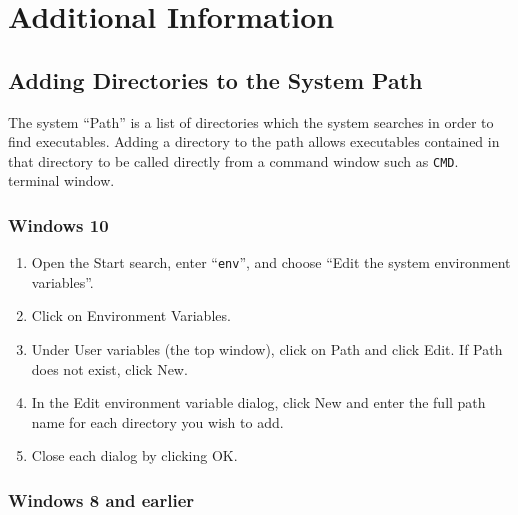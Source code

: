 \section{Additional Information}

\subsection{Adding Directories to the System Path}
\label{SettingPath}

The system ``Path'' is a list of directories which the system searches
in order to find executables. Adding a directory to the path allows
executables contained in that directory to be called directly from a
\ifWindows
command window such as {\tt CMD}.
\else
terminal window.
\fi

\ifWindows

\subsubsection{Windows 10}

\begin{enumerate}

\item Open the {\sf Start} search, enter ``{\tt env}'', and choose
{\sf ``Edit the system environment variables''}.

\item Click on {\sf Environment Variables}.

\item Under {\sf User variables} (the top window), click on {\sf Path}
and click {\sf Edit}. If {\sf Path} does not exist, click {\sf New}.

\item In the {\sf Edit environment variable} dialog, click {\sf New}
and enter the full path name for each directory you wish to add.

\item Close each dialog by clicking {\sf OK}.

\end{enumerate}

\subsubsection{Windows 8 and earlier}

